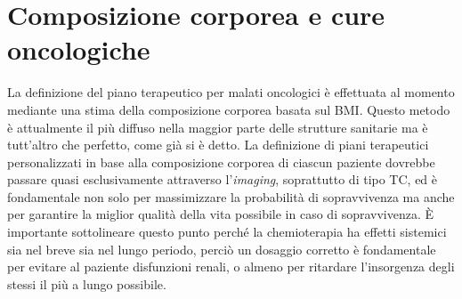 \section{Composizione corporea e cure oncologiche}
La definizione del piano terapeutico per malati oncologici è effettuata al momento mediante una stima della composizione corporea basata sul BMI. Questo metodo è attualmente il più diffuso nella maggior parte delle strutture sanitarie ma è tutt'altro che perfetto, come già si è detto. La definizione di piani terapeutici personalizzati in base alla composizione corporea di ciascun paziente dovrebbe passare quasi esclusivamente attraverso l’\textit{imaging}, soprattutto di tipo TC, ed è fondamentale non solo per massimizzare la probabilità di sopravvivenza ma anche per garantire la miglior qualità della vita possibile in caso di sopravvivenza. È importante sottolineare questo punto perché la chemioterapia ha effetti sistemici sia nel breve sia nel lungo periodo, perciò un dosaggio corretto è fondamentale per evitare al paziente disfunzioni renali, o almeno per ritardare l'insorgenza degli stessi il più a lungo possibile.

